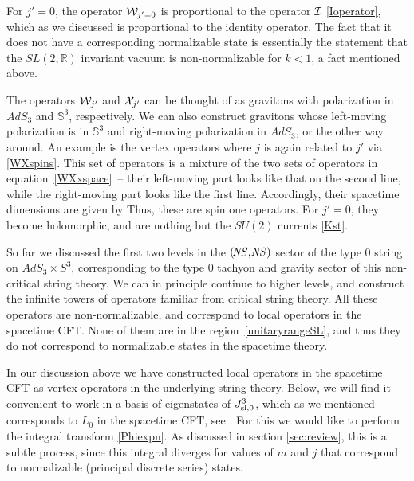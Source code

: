 \documentclass[12pt]{article}
\def\su{\text{su}}
\def\sltwo{\ensuremath{SL(2,\bR)}}
\def\ST{{\sst\it\! ST}}
\def\NS{{\it \!NS}}
\newcommand{\bR}{{\mathbb R}}
\newcommand{\bS}{{\mathbb S}}
\numberwithin{equation}{section}
\def\sst{\scriptscriptstyle}
\begin{document}
For $j'=0$, the operator $\mathcal {W}_{j'=0}$ is proportional to the operator $\mathcal {I}$ \eqref{Ioperator}, which as we discussed is proportional to the identity operator. The fact that it does not have a corresponding normalizable state is essentially the statement that the $\sltwo$ invariant vacuum is non-normalizable for $k<1$, a fact mentioned above. 

The operators $\mathcal {W}_{j'}$ and $\mathcal {X}_{j'}$ can be thought of as gravitons with polarization in $AdS_3$ and $\bS^3$, respectively. We can also construct gravitons whose left-moving polarization is in $\bS^3$ and right-moving polarization in $AdS_3$, or the other way around. An example is the vertex operators
\eqn[hybridvertex]{\cK_{j'}=e^{-\varphi-\bar\varphi}\big(\psi_\su v_{j'}\big)_{j'+1}\bar\psi(\bar x)\, \Phi_j(x,\bar x)~,
}
where $j$ is again related to $j'$ via \eqref{WXspins}.
This set of operators is a mixture of the two sets of operators in equation~\eqref{WXxspace}~-- their left-moving part looks like that on the second line, while the right-moving part looks like the first line. Accordingly, their spacetime dimensions are given by 
\eqn[dimkk]{h_{\ST}\left(\cK_{j'}\right) = j~~,~\;\;\bar h_{\ST}\left(\cK_{j'}\right) = j-1  ~.}
Thus, these are spin one operators. For $j'=0$, they become holomorphic, and are nothing but the $SU(2)$ currents \eqref{Kst}. 

So far we discussed the first two levels in the $(\NS,\NS)$ sector of the type 0 string on $AdS_3\times S^3$, corresponding to the type 0 tachyon and gravity sector of this non-critical string theory. We can in principle continue to higher levels, and construct the infinite towers of operators familiar from critical string theory. All these operators are non-normalizable, and correspond to local operators in the spacetime CFT. None of them are in the region~\eqref{unitaryrangeSL}, and thus they do not correspond to normalizable states in the spacetime theory.  

In our discussion above we have constructed local operators in the spacetime CFT as vertex operators in the underlying string theory. Below, we will find it convenient to work in a basis of eigenstates of $J^3_{\rm sl,0}$, which as we mentioned corresponds to $L_0$ in the spacetime CFT, see \globalsltwo. For this we would like to perform the integral transform \eqref{Phiexpn}. As discussed in section \ref{sec:review}, this is a subtle process, since this integral diverges for values of $m$ and $j$ that correspond to normalizable (principal discrete series) states.   
\end{document}
